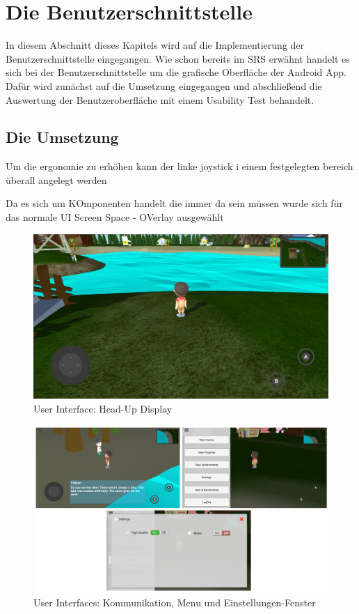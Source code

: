 \section{Die Benutzerschnittstelle}
	In diesem Abschnitt dieses Kapitels wird auf die Implementierung der Benutzerschnittstelle eingegangen. Wie schon bereits im SRS erwähnt handelt es sich bei der Benutzerschnittstelle um die grafische Oberfläche der Android App. Dafür wird zunächst auf die Umsetzung eingegangen und abschließend die Auswertung der Benutzeroberfläche mit einem Usability Test behandelt.
		
	\subsection{Die Umsetzung}	
		Um die ergonomie zu erhöhen kann der linke joystick i einem festgelegten bereich überall angelegt werden
		
		Da es sich um KOmponenten handelt die immer da sein müssen wurde sich für das normale UI Screen Space - OVerlay ausgewählt
		
		\begin{figure}[htbp]
			\centering 
			\label{alwaysOnUI}
			\includegraphics[width=13cm]{pics/alwaysOnUI.png}
			\caption{User Interface: Head-Up Display}
		\end{figure}
	
		\begin{figure}[htbp]
			\centering 
			\label{userInterfaces}
			\includegraphics[width=\textwidth]{pics/userInterface.png}
			\caption{User Interfaces: Kommunikation, Menu und Einstellungen-Fenster}
		\end{figure}
	
